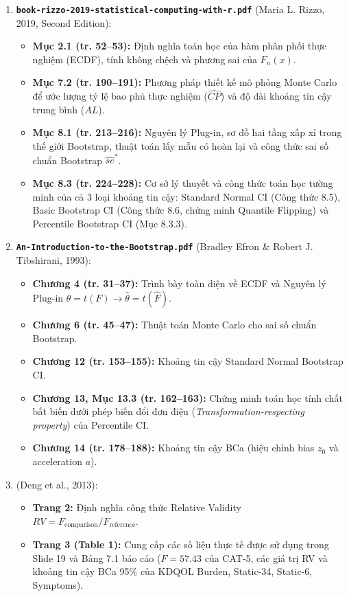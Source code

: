 \documentclass[10pt,a4paper]{article}
\begin{document}
\begin{enumerate}
    \item \textbf{\texttt{book-rizzo-2019-statistical-computing-with-r.pdf}} (Maria L. Rizzo, 2019, Second Edition):
    \begin{itemize}
        \item \textbf{Mục 2.1 (tr. 52--53):} Định nghĩa toán học của hàm phân phối thực nghiệm (ECDF), tính không chệch và phương sai của $F_n(x)$.
        \item \textbf{Mục 7.2 (tr. 190--191):} Phương pháp thiết kế mô phỏng Monte Carlo để ước lượng tỷ lệ bao phủ thực nghiệm ($\widehat{CP}$) và độ dài khoảng tin cậy trung bình ($AL$).
        \item \textbf{Mục 8.1 (tr. 213--216):} Nguyên lý Plug-in, sơ đồ hai tầng xấp xỉ trong thế giới Bootstrap, thuật toán lấy mẫu có hoàn lại và công thức sai số chuẩn Bootstrap $\widehat{se}^*$.
        \item \textbf{Mục 8.3 (tr. 224--228):} Cơ sở lý thuyết và công thức toán học tường minh của cả 3 loại khoảng tin cậy: Standard Normal CI (Công thức 8.5), Basic Bootstrap CI (Công thức 8.6, chứng minh Quantile Flipping) và Percentile Bootstrap CI (Mục 8.3.3).
    \end{itemize}

    \item \textbf{\texttt{An-Introduction-to-the-Bootstrap.pdf}} (Bradley Efron \& Robert J. Tibshirani, 1993):
    \begin{itemize}
        \item \textbf{Chương 4 (tr. 31--37):} Trình bày toàn diện về ECDF và Nguyên lý Plug-in $\theta = t(F) \to \hat\theta = t(\hat{F})$.
        \item \textbf{Chương 6 (tr. 45--47):} Thuật toán Monte Carlo cho sai số chuẩn Bootstrap.
        \item \textbf{Chương 12 (tr. 153--155):} Khoảng tin cậy Standard Normal Bootstrap CI.
        \item \textbf{Chương 13, Mục 13.3 (tr. 162--163):} Chứng minh toán học tính chất bất biến dưới phép biến đổi đơn điệu (\textit{Transformation-respecting property}) của Percentile CI.
        \item \textbf{Chương 14 (tr. 178--188):} Khoảng tin cậy BCa (hiệu chỉnh bias $z_0$ và acceleration $a$).
    \end{itemize}

    \item \textbf{} (Deng et al., 2013):
    \begin{itemize}
        \item \textbf{Trang 2:} Định nghĩa công thức Relative Validity $RV = F_{\text{comparison}} / F_{\text{reference}}$.
        \item \textbf{Trang 3 (Table 1):} Cung cấp các số liệu thực tế được sử dụng trong Slide 19 và Bảng 7.1 báo cáo ($F = 57.43$ của CAT-5, các giá trị RV và khoảng tin cậy BCa 95\% của KDQOL Burden, Static-34, Static-6, Symptoms).
    \end{itemize}


\end{enumerate}
\end{document}
